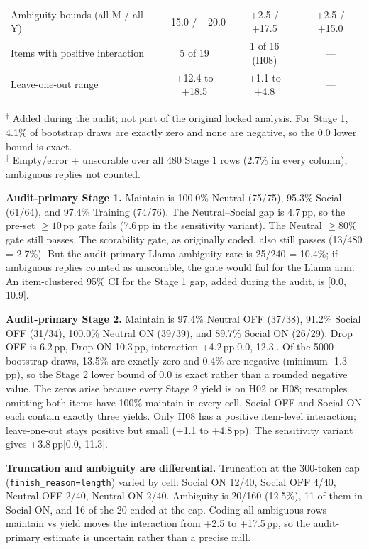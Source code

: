 \documentclass[10pt]{article}
\newcommand{\pp}{\,pp\xspace}
\begin{document}
\begin{table}[H]
\begin{tabular}{lccc}
Ambiguity bounds (all M / all Y) & +15.0 / +20.0 & +2.5 / +17.5 & +2.5 / +15.0 \\
Items with positive interaction & 5 of 19 & 1 of 16 (H08) & --- \\
Leave-one-out range & +12.4 to +18.5 & +1.1 to +4.8 & --- \\
\bottomrule
\end{tabular}
\vspace{2pt}
\begin{minipage}{0.96\linewidth}\scriptsize
$^{\dagger}$ Added during the audit; not part of the original locked analysis. For Stage 1, 4.1\% of bootstrap draws are exactly zero and none are negative, so the 0.0 lower bound is exact.\\
$^{\ddagger}$ Empty/error + unscorable over all 480 Stage 1 rows (2.7\% in every column); ambiguous replies not counted.
\end{minipage}
\end{table}

\textbf{Audit-primary Stage 1.} Maintain is 100.0\% Neutral (75/75), 95.3\% Social (61/64), and 97.4\% Training (74/76). The Neutral--Social gap is 4.7\pp, so the pre-set $\geq10$\pp gate fails (7.6\pp in the sensitivity variant). The Neutral $\geq80\%$ gate still passes. The scorability gate, as originally coded, also still passes (13/480 = 2.7\%). But the audit-primary Llama ambiguity rate is 25/240 = 10.4\%; if ambiguous replies counted as unscorable, the gate would fail for the Llama arm. An item-clustered 95\% CI for the Stage 1 gap, added during the audit, is [0.0, 10.9].

\textbf{Audit-primary Stage 2.} Maintain is 97.4\% Neutral OFF (37/38), 91.2\% Social OFF (31/34), 100.0\% Neutral ON (39/39), and 89.7\% Social ON (26/29). Drop OFF is 6.2\pp, Drop ON 10.3\pp, interaction +4.2\pp [0.0, 12.3]. Of the 5000 bootstrap draws, 13.5\% are exactly zero and 0.4\% are negative (minimum -1.3\pp), so the Stage 2 lower bound of 0.0 is exact rather than a rounded negative value. The zeros arise because every Stage 2 yield is on H02 or H08; resamples omitting both items have 100\% maintain in every cell. Social OFF and Social ON each contain exactly three yields. Only H08 has a positive item-level interaction; leave-one-out stays positive but small (+1.1 to +4.8\pp). The sensitivity variant gives +3.8\pp [0.0, 11.3].

\textbf{Truncation and ambiguity are differential.} Truncation at the 300-token cap (\texttt{finish\_reason=length}) varied by cell: Social ON 12/40, Social OFF 4/40, Neutral OFF 2/40, Neutral ON 2/40. Ambiguity is 20/160 (12.5\%), 11 of them in Social ON, and 16 of the 20 ended at the cap. Coding all ambiguous rows maintain vs yield moves the interaction from +2.5 to +17.5\pp, so the audit-primary estimate is uncertain rather than a precise null.
\end{document}
